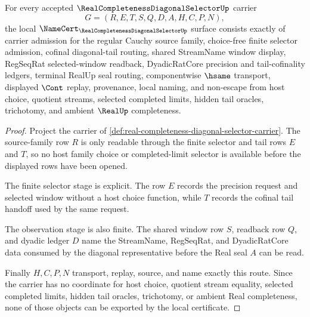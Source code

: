 \begin{theorem}
\label{thm:real-completeness-diagonal-selector-namecert-obligations}
For every accepted $\RealCompletenessDiagonalSelectorUp$ carrier
$$
G=(R,E,T,S,Q,D,A,H,C,P,N),
$$
the local $\NameCert_{\RealCompletenessDiagonalSelectorUp}$ surface consists exactly of carrier admission for the regular Cauchy source family, choice-free finite selector admission, cofinal diagonal-tail routing, shared StreamName window display, RegSeqRat selected-window readback, DyadicRatCore precision and tail-cofinality ledgers, terminal RealUp seal routing, componentwise $\hsame$ transport, displayed $\Cont$ replay, provenance, local naming, and non-escape from host choice, quotient streams, selected completed limits, hidden tail oracles, trichotomy, and ambient $\RealUp$ completeness.
\end{theorem}
\begin{proof}
Project the carrier of \autoref{def:real-completeness-diagonal-selector-carrier}. The source-family row $R$ is only readable through the finite selector and tail rows $E$ and $T$, so no host family choice or completed-limit selector is available before the displayed rows have been opened.

The finite selector stage is explicit. The row $E$ records the precision request and selected window without a host choice function, while $T$ records the cofinal tail handoff used by the same request.

The observation stage is also finite. The shared window row $S$, readback row $Q$, and dyadic ledger $D$ name the StreamName, RegSeqRat, and DyadicRatCore data consumed by the diagonal representative before the Real seal $A$ can be read.

Finally $H,C,P,N$ transport, replay, source, and name exactly this route. Since the carrier has no coordinate for host choice, quotient stream equality, selected completed limits, hidden tail oracles, trichotomy, or ambient Real completeness, none of those objects can be exported by the local certificate.
\end{proof}

